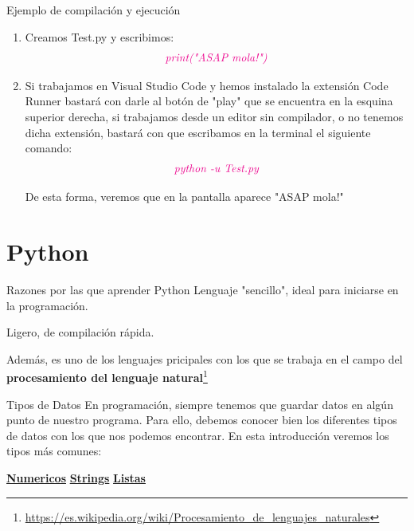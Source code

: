 \documentclass{beamer}
\begin{document}
	\begin{frame}{Ejemplo de compilación y ejecución}
    	\begin{enumerate}
    		\item Creamos Test.py y escribimos: 
    		\begin{gather}
    		    \color{magenta}\textit{print("ASAP mola!")}
    		\end{gather}
    		\item Si trabajamos en Visual Studio Code y hemos instalado la extensión Code Runner bastará con darle al botón de "play" que se encuentra en la esquina superior derecha, si trabajamos desde un editor sin compilador, o no tenemos dicha extensión, bastará con que escribamos en la terminal el siguiente comando:
    		\begin{gather}
    			\color{magenta}\textit{python -u Test.py}
    		\end{gather}
    	
    		De esta forma, veremos que en la pantalla aparece "ASAP mola!"
    	\end{enumerate}
	\end{frame}
	
    \section{Python}

    \begin{frame}{Razones por las que aprender Python}
    	\setlength{\parskip}{8mm} %
        Lenguaje "sencillo", ideal para iniciarse en la programación.
        
        Ligero, de compilación rápida.
        
        Además, es uno de los lenguajes pricipales con los que se trabaja en el campo del \textbf{procesamiento del lenguaje natural}\footnote{\url{https://es.wikipedia.org/wiki/Procesamiento_de_lenguajes_naturales}}
    \end{frame}
    
    \begin{frame}{Tipos de Datos}
    	En programación, siempre tenemos que guardar datos en algún punto de nuestro programa. Para ello, debemos conocer bien los diferentes tipos de datos con los que nos podemos encontrar. En esta introducción veremos los tipos más comunes:
		\vspace{1cm}
		
	 \centering\hyperlink{datos:numericos}{\textbf{Numericos}}
		\hspace{3cm} \hyperlink{datos:strings}{\textbf{Strings}}
		\hspace{3cm} \hyperlink{datos:listas}{\textbf{Listas}}
    \end{frame}
    
\end{document}
